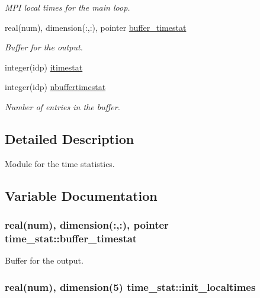 \begin{DoxyCompactItemize}
\begin{DoxyCompactList}\small\item\em M\+PI local times for the main loop. \end{DoxyCompactList}\item 
real(num), dimension(\+:,\+:), pointer \hyperlink{namespacetime__stat_a70919afd7f3ed4f096d2ca67741fafd0}{buffer\+\_\+timestat}
\begin{DoxyCompactList}\small\item\em Buffer for the output. \end{DoxyCompactList}\item 
integer(idp) \hyperlink{namespacetime__stat_ae56826ec9ad1786db72cebc001ac6c8b}{itimestat}
\item 
integer(idp) \hyperlink{namespacetime__stat_a59f96deeaa99d052a09d3f13fd832018}{nbuffertimestat}
\begin{DoxyCompactList}\small\item\em Number of entries in the buffer. \end{DoxyCompactList}\end{DoxyCompactItemize}


\subsection{Detailed Description}
Module for the time statistics. 

\subsection{Variable Documentation}
\subsubsection[{\texorpdfstring{buffer\+\_\+timestat}{buffer_timestat}}]{\setlength{\rightskip}{0pt plus 5cm}real(num), dimension(\+:,\+:), pointer time\+\_\+stat\+::buffer\+\_\+timestat}\hypertarget{namespacetime__stat_a70919afd7f3ed4f096d2ca67741fafd0}{}\label{namespacetime__stat_a70919afd7f3ed4f096d2ca67741fafd0}


Buffer for the output. 

\subsubsection[{\texorpdfstring{init\+\_\+localtimes}{init_localtimes}}]{\setlength{\rightskip}{0pt plus 5cm}real(num), dimension(5) time\+\_\+stat\+::init\+\_\+localtimes}\hypertarget{namespacetime__stat_a80c25f7e592de42aba002a7756c9976a}{}\label{namespacetime__stat_a80c25f7e592de42aba002a7756c9976a}


